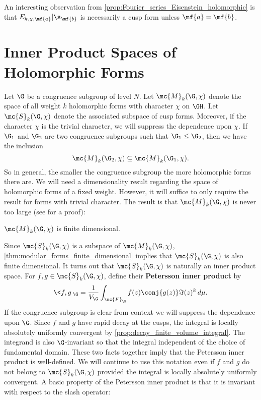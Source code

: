     An interesting observation from \cref{prop:Fourier_series_Eisenstein_holomorphic} is that $E_{k,\chi,\mf{a}}|\s_{\mf{b}}$ is necessarily a cusp form unless $\mf{a} = \mf{b}$.
  \section{Inner Product Spaces of Holomorphic Forms}
    Let $\G$ be a congruence subgroup of level $N$. Let $\mc{M}_{k}(\G,\chi)$ denote the space of all weight $k$ holomorphic forms with character $\chi$ on $\GH$. Let $\mc{S}_{k}(\G,\chi)$ denote the associated subspace of cusp forms. Moreover, if the character $\chi$ is the trivial character, we will suppress the dependence upon $\chi$. If $\G_{1}$ and $\G_{2}$ are two congruence subgroups such that $\G_{1} \le \G_{2}$, then we have the inclusion
    \[
      \mc{M}_{k}(\G_{2},\chi) \subseteq \mc{M}_{k}(\G_{1},\chi).
    \]
    So in general, the smaller the congruence subgroup the more holomorphic forms there are. We will need a dimensionality result regarding the space of holomorphic forms of a fixed weight. However, it will suffice to only require the result for forms with trivial character. The result is that $\mc{M}_{k}(\G,\chi)$ is never too large (see \cite{diamond2005first} for a proof):

    \begin{theorem}\label{thm:modular_forms_finite_dimensional}
      $\mc{M}_{k}(\G,\chi)$ is finite dimensional.
    \end{theorem}

    Since $\mc{S}_{k}(\G,\chi)$ is a subspace of $\mc{M}_{k}(\G,\chi)$, \cref{thm:modular_forms_finite_dimensional} implies that $\mc{S}_{k}(\G,\chi)$ is also finite dimensional. It turns out that $\mc{S}_{k}(\G,\chi)$ is naturally an inner product space. For $f,g \in \mc{S}_{k}(\G,\chi)$, define their \textbf{Petersson inner product} by
    \[
      \<f,g\>_{\G} = \frac{1}{V_{\G}}\int_{\mc{F}_{\G}}f(z)\conj{g(z)}\Im(z)^{k}\,d\mu.
    \]
    If the congruence subgroup is clear from context we will suppress the dependence upon $\G$. Since $f$ and $g$ have rapid decay at the cusps, the integral is locally absolutely uniformly convergent by \cref{prop:decay_finite_volume_integral}. The integrand is also $\G$-invariant so that the integral independent of the choice of fundamental domain. These two facts together imply that the Petersson inner product is well-defined. We will continue to use this notation even if $f$ and $g$ do not belong to $\mc{S}_{k}(\G,\chi)$ provided the integral is locally absolutely uniformly convergent. A basic property of the Petersson inner product is that it is invariant with respect to the slash operator:

